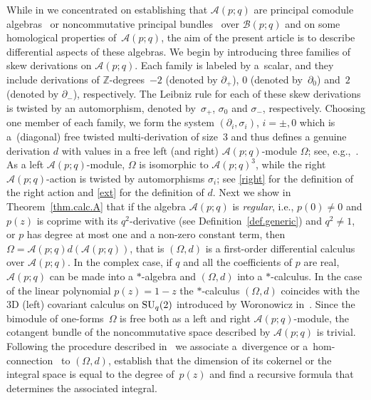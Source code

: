 \documentclass[10pt,a4paper]{amsart}
\numberwithin{equation}{section}
\def\Weyl#1#2{{\mathcal{B}}(#1;#2)}
\def\AWeyl#1#2{{\mathcal{A}}(#1;#2)}
\begin{document}
While in \cite{Brz:gen} we concentrated on establishing that $\AWeyl p q$ are principal comodule algebras~\cite{BrzHaj:Che} or noncommutative principal bundles~\cite{BrzMaj:gau} over $\Weyl p q$ and on some homological properties of~$\AWeyl p q$, the aim of the present article is to describe dif\/ferential aspects of these algebras. We begin by introducing three families of skew derivations on $\AWeyl p q$. Each family is labeled by a~scalar, and they include derivations of ${\mathbb Z}$-degrees~$-2$ (denoted by $\partial_+$), $0$ (denoted by~$\partial_0$) and~$2$ (denoted by $\partial_-$), respectively. The Leibniz rule for each of these skew derivations is twisted by an automorphism, denoted by~$\sigma_+$, $\sigma_0$ and $\sigma_-$, respectively. Choosing one member of each family, we form the system $(\partial_i,\sigma_i)$, $i=\pm, 0$ which is a~(diagonal) free twisted multi-derivation of size~3 and thus def\/ines a genuine derivation $d$ with values in a free left (and right) $\AWeyl p q$-module $\Omega$; see, e.g.,~\cite{BrzElK:int}. As a left $\AWeyl p q$-module, $\Omega$ is isomorphic to $\AWeyl p q^3$, while the right $\AWeyl p q$-action is twisted by automorphisms $\sigma_i$; see \eqref{right} for the def\/inition of the right action and \eqref{ext} for the def\/inition of $d$. Next we show in Theorem~\ref{thm.calc.A} that if the algebra $\AWeyl p q$ is {\em regular}, i.e., $p(0) \neq 0$ and $p(z)$ is coprime with its $q^2$-derivative (see Def\/inition~\ref{def.generic}) and $q^2\neq 1$, or $p$ has degree at most one and a non-zero constant term, then $\Omega = \AWeyl p q d\left(\AWeyl p q\right)$, that is $(\Omega, d)$ is a f\/irst-order dif\/ferential calculus over $\AWeyl p q$. In the complex case, if $q$ and all the coef\/f\/icients of $p$ are real, $\AWeyl p q$ can be made into a $*$-algebra and $(\Omega, d)$ into a $*$-calculus. In the case of the linear polynomial $p(z) = 1-z$ the $*$-calculus $(\Omega, d)$ coincides with the 3D (left) covariant calculus on ${\rm SU}_q(2)$ introduced by Woronowicz in~\cite{Wor:twi}. Since the bimodule of one-forms~$\Omega$ is free both as a left and right $\AWeyl p q$-module, the cotangent bundle of the noncommutative space described by $\AWeyl p q$ is trivial. Following the procedure described in~\cite{BrzElK:int} we associate a~divergence or a~hom-connection~\cite{Brz:con} to $(\Omega, d)$, establish that the dimension of its cokernel or the integral space is equal to the degree of~$p(z)$ and f\/ind a recursive formula that determines the associated integral.
\end{document}

